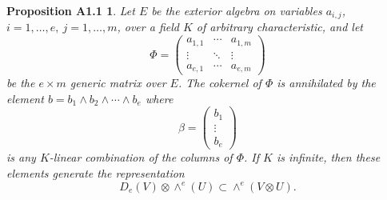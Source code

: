 \documentclass{tran-l}
\theoremstyle{plain}
\newtheorem*{theorem18}{Proposition A1.1}
\theoremstyle{remark}
\theoremstyle{definition}
\begin{document}
\begin{theorem18}
Let $E$ be the exterior algebra
on variables $a_{i,j}$, $ i=1,\dots ,e,\ j=1,\dots , m$, over
a field $K$ of arbitrary characteristic, and let 
\begin{equation*}\Phi =
\left(\begin{matrix}
a_{1,1}&\cdots&a_{1,m}\\
\vdots&\ddots&\vdots\\
a_{e,1}&\cdots&a_{e,m}
\end{matrix}\right)
\end{equation*}
be the $e\times m$ generic matrix over $E$. The cokernel
of $\Phi $ is annihilated by the element
$b= b_{1}\wedge b_{2}\wedge \cdots \wedge b_{e}$ where
\begin{equation*} \beta =
\left(\begin{matrix}
 b_1\\
\vdots\\
 b_e
\end{matrix}\right)
 \end{equation*}
is any $K$-linear combination of the columns of $\Phi $. If
$K$ is infinite, then these
elements generate the representation
\begin{equation*}D_{e}(V)\otimes \wedge ^{e}(U)\subset \wedge ^{e}(V\otimes U).
\end{equation*}
\end{theorem18}
\end{document}
